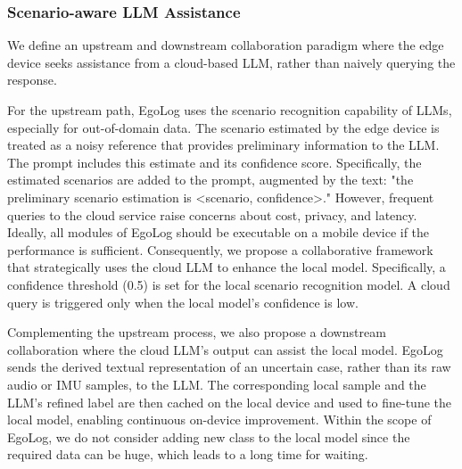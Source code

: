\subsubsection{Scenario-aware LLM Assistance}

We define an upstream and downstream collaboration paradigm where the edge device seeks assistance from a cloud-based LLM, rather than naively querying the response.

For the upstream path, EgoLog uses the scenario recognition capability of LLMs, especially for out-of-domain data. The scenario estimated by the edge device is treated as a noisy reference that provides preliminary information to the LLM. The prompt includes this estimate and its confidence score.
Specifically, the estimated scenarios are added to the prompt, augmented by the text: "the preliminary scenario estimation is <scenario, confidence>."
However, frequent queries to the cloud service raise concerns about cost, privacy, and latency. Ideally, all modules of EgoLog should be executable on a mobile device if the performance is sufficient. Consequently, we propose a collaborative framework that strategically uses the cloud LLM to enhance the local model. Specifically, a confidence threshold (0.5) is set for the local scenario recognition model. A cloud query is triggered only when the local model's confidence is low.

Complementing the upstream process, we also propose a downstream collaboration where the cloud LLM's output can assist the local model. EgoLog sends the derived textual representation of an uncertain case, rather than its raw audio or IMU samples, to the LLM. The corresponding local sample and the LLM's refined label are then cached on the local device and used to fine-tune the local model, enabling continuous on-device improvement.
Within the scope of EgoLog, we do not consider adding new class to the local model since the required data can be huge, which leads to a long time for waiting.



